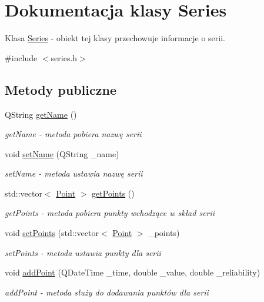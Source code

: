 \hypertarget{class_series}{\section{Dokumentacja klasy Series}
\label{class_series}
}


Klasa \hyperlink{class_series}{Series} -\/ obiekt tej klasy przechowuje informacje o serii.  




{\ttfamily \#include $<$series.\+h$>$}

\subsection*{Metody publiczne}
\begin{DoxyCompactItemize}
\item 
Q\+String \hyperlink{class_series_aeec7b0318147f133101233930a9fe0bd}{get\+Name} ()
\begin{DoxyCompactList}\small\item\em get\+Name -\/ metoda pobiera nazwę serii \end{DoxyCompactList}\item 
void \hyperlink{class_series_a45e36a2f91ffda781a2bd6ac1e42799a}{set\+Name} (Q\+String \+\_\+name)
\begin{DoxyCompactList}\small\item\em set\+Name -\/ metoda ustawia nazwę serii \end{DoxyCompactList}\item 
std\+::vector$<$ \hyperlink{class_point}{Point} $>$ \hyperlink{class_series_acce7f1886fd9fca8a0bed0de308d3206}{get\+Points} ()
\begin{DoxyCompactList}\small\item\em get\+Points -\/ metoda pobiera punkty wchodzące w skład serii \end{DoxyCompactList}\item 
void \hyperlink{class_series_ae1c659538591e22f42495c281934e2a3}{set\+Points} (std\+::vector$<$ \hyperlink{class_point}{Point} $>$ \+\_\+points)
\begin{DoxyCompactList}\small\item\em set\+Points -\/ metoda ustawia punkty dla serii \end{DoxyCompactList}\item 
void \hyperlink{class_series_aedcbd470ac2ae2807be45c2339503991}{add\+Point} (Q\+Date\+Time \+\_\+time, double \+\_\+value, double \+\_\+reliability)
\begin{DoxyCompactList}\small\item\em add\+Point -\/ metoda służy do dodawania punktów dla serii \end{DoxyCompactList}\end{DoxyCompactItemize}
